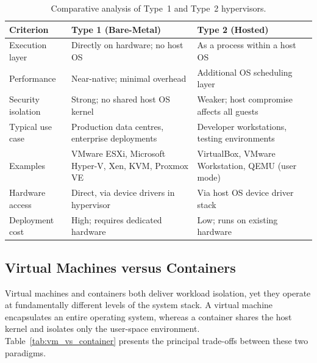 \documentclass[12pt,a4paper]{report}
\begin{document}
\begin{table}[htbp]
\centering
\caption{Comparative analysis of Type~1 and Type~2 hypervisors.}
\label{tab:hypervisors}
\begin{tabular}{L{3.2cm} L{5.5cm} L{5.5cm}}
\toprule
\textbf{Criterion} & \textbf{Type 1 (Bare-Metal)} & \textbf{Type 2 (Hosted)} \\
\midrule
Execution layer     & Directly on hardware; no host OS & As a process within a host OS \\
\addlinespace
Performance         & Near-native; minimal overhead & Additional OS scheduling layer \\
\addlinespace
Security isolation  & Strong; no shared host OS kernel & Weaker; host compromise affects all guests \\
\addlinespace
Typical use case    & Production data centres, enterprise deployments & Developer workstations, testing environments \\
\addlinespace
Examples            & VMware ESXi, Microsoft Hyper-V, Xen, KVM, Proxmox VE & VirtualBox, VMware Workstation, QEMU (user mode) \\
\addlinespace
Hardware access     & Direct, via device drivers in hypervisor & Via host OS device driver stack \\
\addlinespace
Deployment cost     & High; requires dedicated hardware & Low; runs on existing hardware \\
\bottomrule
\end{tabular}
\end{table}

\subsection{Virtual Machines versus Containers}

Virtual machines and containers both deliver workload isolation, yet they operate at
fundamentally different levels of the system stack. A virtual machine encapsulates an
entire operating system, whereas a container shares the host kernel and isolates only
the user-space environment. Table~\ref{tab:vm_vs_container} presents the principal
trade-offs between these two paradigms.
\end{document}
